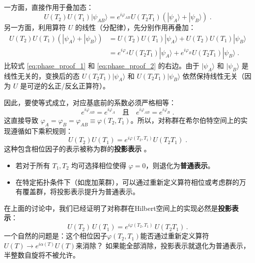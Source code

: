 一方面，直接作用于叠加态：
\begin{equation}
    U(T_2)U(T_1) |\psi_{AB}\rangle = e^{i\varphi_{AB}} U(T_2 T_1) (|\psi_A\rangle + |\psi_B\rangle) \;. \label{eq:phase_proof_1}
\end{equation}
另一方面，利用算符 $U$ 的线性（分配律），先分别作用再叠加：
\begin{equation}
    \begin{aligned}
        U(T_2)U(T_1) (|\psi_A\rangle + |\psi_B\rangle) &= U(T_2)U(T_1)|\psi_A\rangle + U(T_2)U(T_1)|\psi_B\rangle \\
        &= e^{i\varphi_A} U(T_2 T_1)|\psi_A\rangle + e^{i\varphi_B} U(T_2 T_1)|\psi_B\rangle \;.
    \end{aligned} \label{eq:phase_proof_2}
\end{equation}
比较式 \eqref{eq:phase_proof_1} 和 \eqref{eq:phase_proof_2} 的右边。由于 $|\psi_A\rangle$ 和 $|\psi_B\rangle$ 是线性无关的，变换后的态 $U(T_2 T_1)|\psi_A\rangle$ 和 $U(T_2 T_1)|\psi_B\rangle$ 依然保持线性无关（因为 $U$ 是可逆的幺正/反幺正算符）。

因此，要使等式成立，对应基底前的系数必须严格相等：
\begin{equation}
    e^{i\varphi_{AB}} = e^{i\varphi_A} \quad \text{且} \quad e^{i\varphi_{AB}} = e^{i\varphi_B} \;.
\end{equation}
这直接导致 $\varphi_A = \varphi_B = \varphi_{AB} \equiv \varphi(T_2, T_1)$。所以，对称群在希尔伯特空间上的实现遵循如下乘积规则：
\begin{equation}
    U(T_2)U(T_1) = e^{i\varphi(T_2, T_1)} U(T_2 T_1) \;. \label{eq:projective_rep}
\end{equation}
这种包含相位因子的表示被称为群的\textbf{投影表示 }。
\begin{itemize}
    \item 若对于所有 $T_1, T_2$ 均可选择相位使得 $\varphi=0$，则退化为\textbf{普通表示}。
    \item 在特定拓扑条件下（如庞加莱群），可以通过重新定义算符相位或考虑群的万有覆盖群，将投影表示提升为普通表示。
\end{itemize}
\topictitle{***}
在上面的讨论中，我们已经证明了对称群在Hilbert空间上的实现必然是\textbf{投影表示}：
\begin{equation}
    U(T_2)\,U(T_1) = e^{i\varphi(T_2,T_1)}\,U(T_2 T_1)\,.
\end{equation}
一个自然的问题是：这个相位因子$\varphi(T_2,T_1)$能否通过重新定义算符$U(T)\to e^{i\alpha(T)}U(T)$来消除？
如果能全部消除，投影表示就退化为普通表示，半整数自旋将不被允许。


